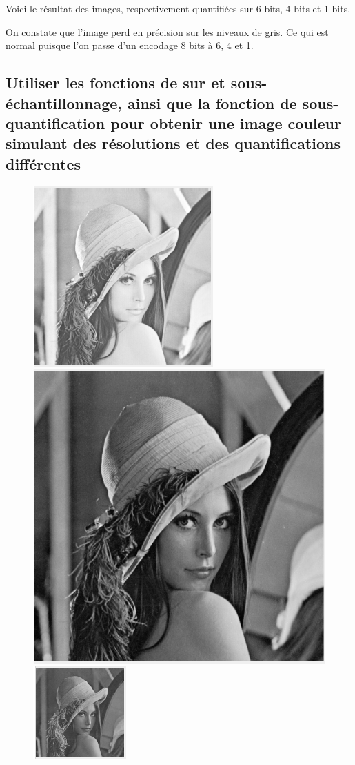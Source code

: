 \documentclass[a4paper,12pt]{report}
\begin{document}
\noindent Voici le résultat des images, respectivement quantifiées sur 6 bits, 4 bits et 1 bits.

On constate que l'image perd en précision sur les niveaux de gris. Ce qui est normal puisque l'on passe d'un encodage 8 bits à 6, 4 et 1.

\subsection*{Utiliser les fonctions de sur et sous-échantillonnage, ainsi que la fonction de sous-quantification pour obtenir une image couleur simulant des résolutions et des quantifications différentes}


\begin{figure}[!ht]
	\center
	\includegraphics[scale=0.3]{image/p331.png}
	\includegraphics[scale=0.3]{image/p332.png}
	\includegraphics[scale=0.3]{image/p333.png}
\end{figure}
\end{document}
